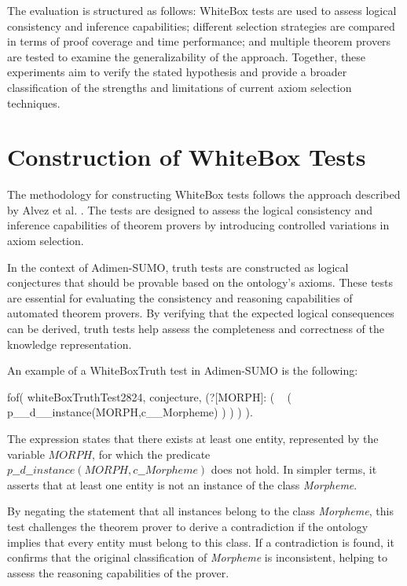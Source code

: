 \documentclass[english,version-2020-11]{uzl-thesis}
\begin{document}
The evaluation is structured as follows: WhiteBox tests are used to assess logical consistency and inference capabilities; different selection strategies are compared in terms of proof coverage and time performance; and multiple theorem provers are tested to examine the generalizability of the approach. Together, these experiments aim to verify the stated hypothesis and provide a broader classification of the strengths and limitations of current axiom selection techniques.


\section{Construction of WhiteBox Tests}

The methodology for constructing WhiteBox tests follows the approach described by Alvez et al. \cite{Alvez2017}. The tests are designed to assess the logical consistency and inference capabilities of theorem provers by introducing controlled variations in axiom selection.

In the context of Adimen-SUMO, truth tests are constructed as logical conjectures that should be provable based on the ontology's axioms. These tests are essential for evaluating the consistency and reasoning capabilities of automated theorem provers. By verifying that the expected logical consequences can be derived, truth tests help assess the completeness and correctness of the knowledge representation. 

\newpage

An example of a WhiteBoxTruth test in Adimen-SUMO is the following:

\begin{Pseudocode}[morekeywords = {add, create}, deletekeywords={to}, numbers=left,
    caption = {WhiteboxTruth test example}]
    fof( whiteBoxTruthTest2824, conjecture,
        (?[MORPH]: 
            (
                ~ (
                    p__d__instance(MORPH,c__Morpheme)
                )
            )
        )
    ).
\end{Pseudocode}


The expression states that there exists at least one entity, represented by the variable \( MORPH \), for which the predicate \( p\_\_d\_\_instance(MORPH, c\_\_Morpheme) \) does not hold. In simpler terms, it asserts that at least one entity is not an instance of the class \textit{Morpheme}.

By negating the statement that all instances belong to the class \textit{Morpheme}, this test challenges the theorem prover to derive a contradiction if the ontology implies that every entity must belong to this class. If a contradiction is found, it confirms that the original classification of \textit{Morpheme} is inconsistent, helping to assess the reasoning capabilities of the prover.
\end{document}
